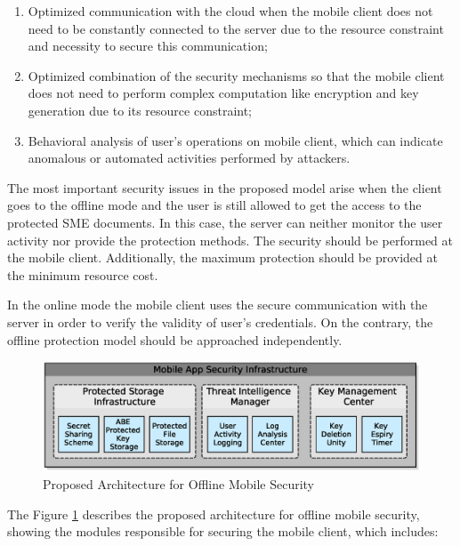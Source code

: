 \begin{enumerate}
	\item Optimized communication with the cloud when the mobile client does not need to be constantly connected to the server due to the resource constraint and necessity to secure this communication;
	\item Optimized combination of the security mechanisms so that the mobile client does not need to perform complex computation like encryption and key generation due to its resource constraint;
	\item Behavioral analysis of user's operations on mobile client, which can indicate anomalous or automated activities performed by attackers.
\end{enumerate}

The most important security issues in the proposed model arise when the client goes to the offline mode and the user is still allowed to get the access to the protected SME documents. In this case, the server can neither monitor the user activity nor provide the protection methods. The security should be performed at the mobile client. Additionally, the maximum protection should be provided at the minimum resource cost. 

In the online mode the mobile client uses the secure communication with the server in order to verify the validity of user’s credentials. On the contrary, the offline protection model should be approached independently.

\begin{figure}[h!]
	\centering
	\includegraphics[width=15cm]{figures/ch3/fig03.eps}
	\caption{Proposed Architecture for Offline Mobile Security}
	\label{fig:3_03}
\end{figure}

The Figure \ref{fig:3_03} describes the proposed architecture for offline mobile security, showing the modules responsible for securing the mobile client, which includes:

